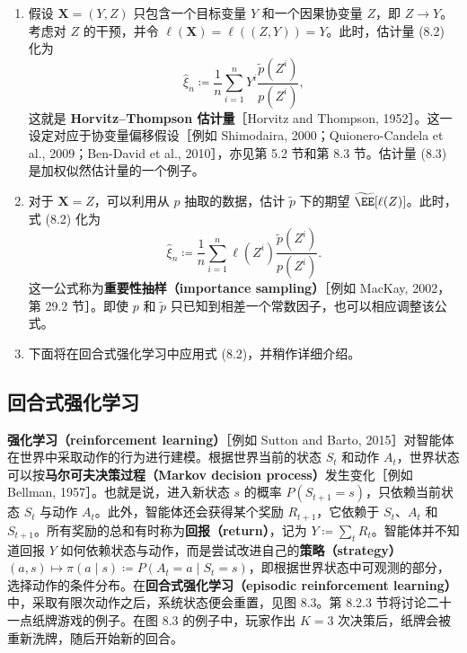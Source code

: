 \begin{enumerate}[label=(\roman*)]
 \item 假设 $\mathbf X=(Y,Z)$ 只包含一个目标变量 $Y$ 和一个因果协变量 $Z$，即 $Z\to Y$。考虑对 $Z$ 的干预，并令 $\ell(\mathbf X)=\ell((Z,Y))=Y$。此时，估计量 (8.2) 化为
 \begin{equation}
  \widehat\xi_n\coloneqq\frac1n\sum_{i=1}^nY^i\frac{\widetilde p(Z^i)}{p(Z^i)},
  \tag{8.3}
 \end{equation}
 这就是 \textbf{Horvitz–Thompson 估计量}［Horvitz and Thompson, 1952］。这一设定对应于协变量偏移假设［例如 Shimodaira, 2000；Quionero-Candela et al., 2009；Ben-David et al., 2010］，亦见第 5.2 节和第 8.3 节。估计量 (8.3) 是加权似然估计量的一个例子。
 \item 对于 $\mathbf X=Z$，可以利用从 $p$ 抽取的数据，估计 $\widetilde p$ 下的期望 $\widetilde{\EE}[\ell(Z)]$。此时，式 (8.2) 化为
 \[
  \widehat\xi_n\coloneqq\frac1n\sum_{i=1}^n\ell(Z^i)\frac{\widetilde p(Z^i)}{p(Z^i)}.
 \]
 这一公式称为\textbf{重要性抽样（importance sampling）}［例如 MacKay, 2002，第 29.2 节］。即使 $p$ 和 $\widetilde p$ 只已知到相差一个常数因子，也可以相应调整该公式。
 \item 下面将在回合式强化学习中应用式 (8.2)，并稍作详细介绍。
\end{enumerate}

\subsection{回合式强化学习}
\label{sec:ch08-episodic}

\textbf{强化学习（reinforcement learning）}［例如 Sutton and Barto, 2015］对智能体在世界中采取动作的行为进行建模。根据世界当前的状态 $S_t$ 和动作 $A_t$，世界状态可以按\textbf{马尔可夫决策过程（Markov decision process）}发生变化［例如 Bellman, 1957］。也就是说，进入新状态 $s$ 的概率 $P(S_{t+1}=s)$，只依赖当前状态 $S_t$ 与动作 $A_t$。此外，智能体还会获得某个奖励 $R_{t+1}$，它依赖于 $S_t$、$A_t$ 和 $S_{t+1}$。所有奖励的总和有时称为\textbf{回报（return）}，记为 $Y\coloneqq\sum_tR_t$。智能体并不知道回报 $Y$ 如何依赖状态与动作，而是尝试改进自己的\textbf{策略（strategy）}$(a,s)\mapsto\pi(a\mid s)\coloneqq P(A_t=a\mid S_t=s)$，即根据世界状态中可观测的部分，选择动作的条件分布。在\textbf{回合式强化学习（episodic reinforcement learning）}中，采取有限次动作之后，系统状态便会重置，见图 8.3。第 8.2.3 节将讨论二十一点纸牌游戏的例子。在图 8.3 的例子中，玩家作出 $K=3$ 次决策后，纸牌会被重新洗牌，随后开始新的回合。



